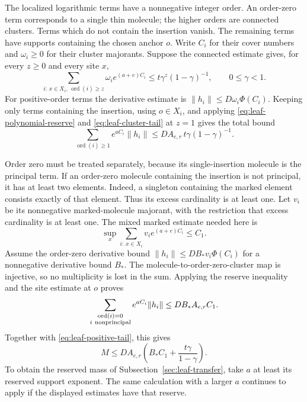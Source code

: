 The localized logarithmic terms have a nonnegative integer order.
An order-zero term corresponds to a single thin molecule; the higher
orders are connected clusters. Terms which do not contain the insertion
vanish. The remaining terms have supports containing the chosen
anchor $o$. Write $C_i$ for their cover numbers and $\omega_i\ge0$
for their cluster majorants. Suppose the connected estimate gives,
for every $z\ge0$ and every site $x$,
\begin{equation}\label{eq:leaf-cluster-tail}
 \sum_{i:\,x\in X_i,\,\operatorname{ord}(i)\ge z}
              \omega_i e^{(a+e)C_i}
                      \le t\gamma^z(1-\gamma)^{-1},
                        \qquad 0\le\gamma<1.
\end{equation}
For positive-order terms the derivative estimate is
$\|h_i\|\le D\omega_i\Phi(C_i)$. Keeping only terms containing the
insertion, using $o\in X_i$, and applying
\eqref{eq:leaf-polynomial-reserve} and
\eqref{eq:leaf-cluster-tail} at $z=1$ gives the total bound
\begin{equation}\label{eq:leaf-positive-tail}
 \sum_{\operatorname{ord}(i)\ge1}e^{aC_i}\|h_i\|
                   \le D A_{e,r}\,t\gamma(1-\gamma)^{-1}.
\end{equation}

Order zero must be treated separately, because its single-insertion
molecule is the principal term. If an order-zero molecule containing
the insertion is not principal, it has at least two elements. Indeed,
a singleton containing the marked element consists exactly of that
element. Thus its excess cardinality is at least one. Let $v_i$ be
its nonnegative marked-molecule majorant, with the restriction that
excess cardinality is at least one. The mixed marked estimate needed
here is
\[
       \sup_x\sum_{i:\,x\in X_i}v_i e^{(a+e)C_i}\le C_1.
\]
Assume the order-zero derivative bound
$\|h_i\|\le D B_*v_i\Phi(C_i)$ for a nonnegative derivative bound
$B_*$. The molecule-to-order-zero-cluster map is injective, so no
multiplicity is lost in the sum. Applying the reserve inequality and
the site estimate at $o$ proves
\[
 \sum_{\substack{\operatorname{ord}(i)=0\\i\ {\rm nonprincipal}}}
                  e^{aC_i}\|h_i\|\le D B_* A_{e,r} C_1.
\]
Together with \eqref{eq:leaf-positive-tail}, this gives
\begin{equation}\label{eq:leaf-tail-produced}
 M\le D A_{e,r}\left(B_*C_1+\frac{t\gamma}{1-\gamma}\right).
\end{equation}
To obtain the reserved mass of Subsection~\ref{sec:leaf-transfer}, take
$a$ at least its reserved support exponent. The same calculation with
a larger $a$ continues to apply if the displayed estimates have that
reserve.

